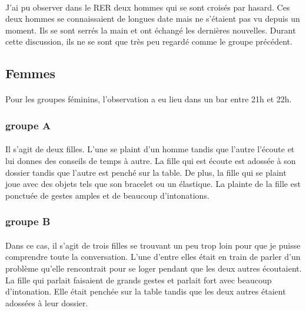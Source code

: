 \paragraph{} J'ai pu observer dans le RER deux hommes qui se sont croisés par
hasard. Ces deux hommes se connaissaient de longues date mais ne s'étaient pas
vu depuis un moment. Ils se sont serrés la main et ont échangé les dernières
nouvelles. Durant cette discussion, ils ne se sont que très peu regardé comme
le groupe précédent.

\subsection{Femmes}

\paragraph{} Pour les groupes féminins, l'observation a eu lieu dans un bar
entre 21h et 22h.

\subsubsection{groupe A}

\paragraph{} Il s'agit de deux filles. L'une se plaint d'un homme tandis que
l'autre l'écoute et lui donnes des conseils de temps à autre. La fille qui est
écoute est adossée à son dossier tandis que l'autre est penché sur la table. De
plus, la fille qui se plaint joue avec des objets tels que son bracelet ou un
élastique. La plainte de la fille est ponctuée de gestes amples et de beaucoup
d'intonations.

\subsubsection{groupe B}

\paragraph{} Dans ce cas, il s'agit de trois filles se trouvant un peu trop
loin pour que je puisse comprendre toute la conversation. L'une d'entre elles
était en train de parler d'un problème qu'elle rencontrait pour se loger
pendant que les deux autres écoutaient. La fille qui parlait faisaient de grands
gestes et parlait fort avec beaucoup d'intonation. Elle était penchée sur la
table tandis que les deux autres étaient adossées à leur dossier.

